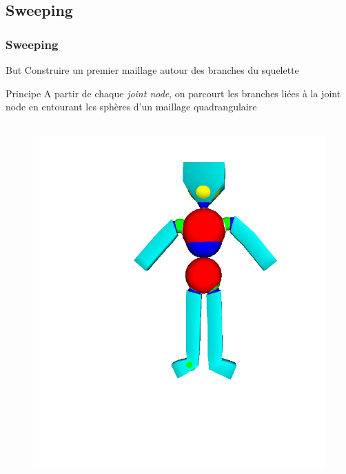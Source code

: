 \documentclass[9pt]{beamer}
\begin{document}
\subsection{Sweeping}
\begin{frame}
	\frametitle{Sweeping}
	\begin{block}{But}
		Construire un premier maillage autour des branches du squelette
	\end{block}
	\begin{block}{Principe}
		A partir de chaque \textit{joint node}, on parcourt les branches liées à la joint node en entourant les sphères d'un maillage quadrangulaire
	\end{block}
		\begin{figure}[H]
		\centering
		\leavevmode
  		\hbox{
  			\includegraphics[scale=0.25]{images/sweeping1.jpg}
  			\hspace*{0.5cm} 
}
\end{figure}
\end{frame}
\end{document}
